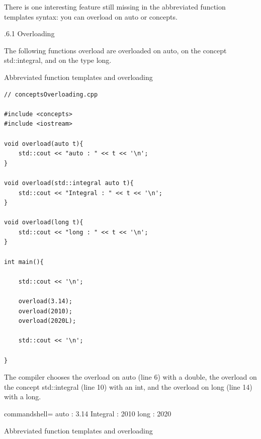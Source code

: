 There is one interesting feature still missing in the abbreviated function templates syntax: you can overload on auto or concepts.

.6.1\hspace{0.2cm} Overloading

The following functions overload are overloaded on auto, on the concept std::integral, and on the type long.

\noindent
Abbreviated function templates and overloading
\begin{lstlisting}[style=styleCXX]
// conceptsOverloading.cpp

#include <concepts>
#include <iostream>

void overload(auto t){
	std::cout << "auto : " << t << '\n';
}

void overload(std::integral auto t){
	std::cout << "Integral : " << t << '\n';
}

void overload(long t){
	std::cout << "long : " << t << '\n';
}

int main(){

	std::cout << '\n';
	
	overload(3.14);
	overload(2010);
	overload(2020L);
	
	std::cout << '\n';

}
\end{lstlisting}

The compiler chooses the overload on auto (line 6) with a double, the overload on the concept std::integral (line 10) with an int, and the overload on long (line 14) with a long.

\begin{tcblisting}{commandshell={}}
auto : 3.14
Integral : 2010
long : 2020
\end{tcblisting}

\begin{center}
Abbreviated function templates and overloading
\end{center}

